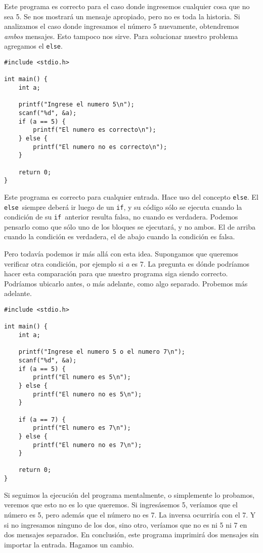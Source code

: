 \documentclass[10pt]{article}
\newcommand{\cif}[0]{\lstinline{if}}
\newcommand{\celse}[0]{\lstinline{else}}
\begin{document}
Este programa es correcto para el caso donde ingresemos cualquier cosa que no sea 5. Se nos mostrará un mensaje apropiado, pero no es toda la historia. Si analizamos el caso donde ingresamos el número 5 nuevamente, obtendremos \textit{ambos} mensajes. Esto tampoco nos sirve. Para solucionar nuestro problema agregamos el \celse.

\begin{lstlisting}
#include <stdio.h>

int main() {
	int a;

	printf("Ingrese el numero 5\n");
	scanf("%d", &a);
	if (a == 5) {
		printf("El numero es correcto\n");
	} else {
		printf("El numero no es correcto\n");
	}

	return 0;
}
\end{lstlisting}

Este programa es correcto para cualquier entrada. Hace uso del concepto \celse. El \celse\ siempre deberá ir luego de un \cif, y su código sólo se ejecuta cuando la condición de su \cif\ anterior resulta falsa, no cuando es verdadera. Podemos pensarlo como que sólo uno de los bloques se ejecutará, y no ambos. El de arriba cuando la condición es verdadera, el de abajo cuando la condición es falsa.

\bigskip

Pero todavía podemos ir más allá con esta idea. Supongamos que queremos verificar otra condición, por ejemplo si \textit{a} es 7. La pregunta es dónde podríamos hacer esta comparación para que nuestro programa siga siendo correcto. Podríamos ubicarlo antes, o más adelante, como algo separado. Probemos más adelante.

\begin{lstlisting}
#include <stdio.h>

int main() {
	int a;

	printf("Ingrese el numero 5 o el numero 7\n");
	scanf("%d", &a);
	if (a == 5) {
		printf("El numero es 5\n");
	} else {
		printf("El numero no es 5\n");
	}

	if (a == 7) {
		printf("El numero es 7\n");
	} else {
		printf("El numero no es 7\n");
	}

	return 0;
}
\end{lstlisting}

Si seguimos la ejecución del programa mentalmente, o simplemente lo probamos, veremos que esto no es lo que queremos. Si ingresásemos 5, veríamos que el número es 5, pero además que el número no es 7. La inversa ocurriría con el 7. Y si no ingresamos ninguno de los dos, sino otro, veríamos que no es ni 5 ni 7 en dos mensajes separados. En conclusión, este programa imprimirá dos mensajes sin importar la entrada. Hagamos un cambio.
\end{document}
